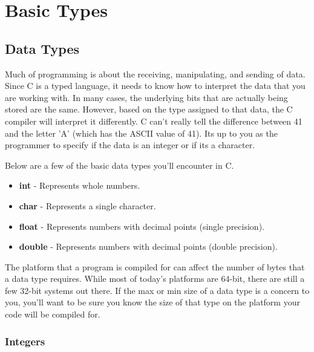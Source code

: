 \documentclass[../main.tex]{subfiles}
\begin{document}
	\chapter{Basic Types}
	
	
	\section{Data Types}
	
	Much of programming is about the receiving, manipulating, and sending of data.  Since C is a typed language, it needs to know how to interpret the data that you are working with.  In many cases, the underlying bits that are actually being stored are the same.  However, based on the type assigned to that data, the C compiler will interpret it differently.  C can't really tell the difference between 41 and the letter 'A' (which has the ASCII value of 41).  Its up to you as the programmer to specify if the data is an integer or if its a character.
	
	Below are a few of the basic data types you'll encounter in C.	
	\begin{itemize}
		\item \textbf{int}		-	Represents whole numbers.
		\item \textbf{char}		-	Represents a single character.
		\item \textbf{float}	-	Represents numbers with decimal points (single precision).
		\item \textbf{double} 	-	Represents numbers with decimal points (double precision).
	\end{itemize}

	The platform that a program is compiled for can affect the number of bytes that a data type requires.  While most of today's platforms are 64-bit, there are still a few 32-bit systems out there.  If the max or min size of a data type is a concern to you, you'll want to be sure you know the size of that type on the platform your code will be compiled for.
	\subsection{Integers}
	
\end{document}
